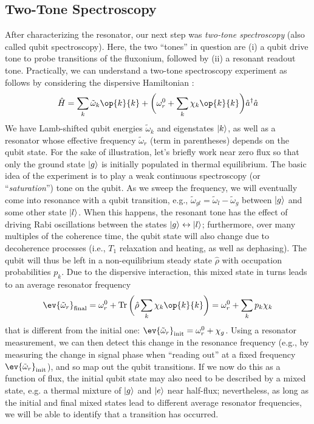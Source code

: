 \newpage
\subsection{Two-Tone Spectroscopy}
After characterizing the resonator, our next step was \textit{two-tone spectroscopy} (also called qubit spectroscopy). Here, the two ``tones'' in question are (i) a qubit drive tone to probe transitions of the fluxonium, followed by (ii) a resonant readout tone. Practically, we can understand a two-tone spectroscopy experiment as follows by considering the dispersive Hamiltonian \cite{zhu2013cQEDfluxonium}:
\begin{equation}
    \hat{H} = \sum_k \tilde{\omega}_k \op{k}{k} + \bigg(\omega_r^0 + \sum_k \chi_k \op{k}{k}\bigg) \hat{a}^\dagger\hat{a}
\end{equation}
We have Lamb-shifted qubit energies $\tilde{\omega}_k$ and eigenstates $\lvert k\rangle$, as well as a resonator whose effective frequency $\tilde{\omega}_r$ (term in parentheses) depends on the qubit state. For the sake of illustration, let's briefly work near zero flux so that only the ground state $\lvert g\rangle$ is initially populated in thermal equilibrium. The basic idea of the experiment is to play a weak continuous spectroscopy (or ``\textit{saturation}'') tone on the qubit. As we sweep the frequency, we will eventually come into resonance with a qubit transition, e.g., $\tilde{\omega}_{gl} = \tilde{\omega}_{l} - \tilde{\omega}_{g}$ between $\lvert g\rangle$ and some other state $\lvert l\rangle$. When this happens, the resonant tone has the effect of driving Rabi oscillations between the states $\lvert g\rangle \leftrightarrow \lvert l\rangle$; furthermore, over many multiples of the coherence time, the qubit state will also change due to decoherence processes (i.e., $T_1$ relaxation and heating, as well as dephasing). The qubit will thus be left in a non-equilibrium steady state $\hat{\rho}$ with occupation probabilities $p_k$. Due to the dispersive interaction, this mixed state in turns leads to an average resonator frequency
\begin{equation}
    \ev{\tilde{\omega}_r}_{\rm final} = \omega_r^0 + \Tr\bigg(\hat{\rho} \sum_k \chi_k \op{k}{k}\bigg) = \omega_r^0 + \sum_k p_k \chi_k
\end{equation}
that is different from the initial one: $\ev{\tilde{\omega}_r}_{\rm init} = \omega_r^0 + \chi_g$. Using a resonator measurement, we can then detect this change in the resonance frequency (e.g., by measuring the change in signal phase when ``reading out'' at a fixed frequency $\ev{\tilde{\omega}_r}_{\rm init}$), and so map out the qubit transitions. If we now do this as a function of flux, the initial qubit state may also need to be described by a mixed state, e.g. a thermal mixture of $\lvert g\rangle$ and $\lvert e\rangle$ near half-flux; nevertheless, as long as the initial and final mixed states lead to different average resonator frequencies, we will be able to identify that a transition has occurred. 

